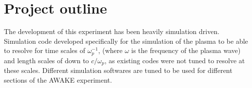
\chapter{Project outline}

\lipsum[3-56]

The development of this experiment has been heavily simulation driven.
Simulation code developed specifically for the simulation of the plasma to be
able to resolve for time scales of \(\omega_p^{-1}\), (where \(\omega\) is the
frequency of the plasma wave) and length scales of down to \(c/\omega_p\), as
existing codes were not tuned to resolve at these scales.  Different simulation
softwares are tuned to be used for different sections of the AWAKE experiment.



